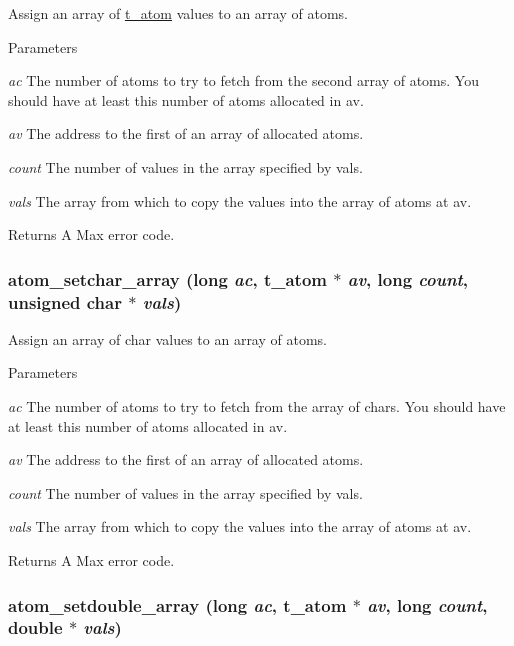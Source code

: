 Assign an array of \hyperlink{structt__atom}{t\_\-atom} values to an array of atoms. 
\begin{DoxyParams}{Parameters}
\item[{\em ac}]The number of atoms to try to fetch from the second array of atoms. You should have at least this number of atoms allocated in av. \item[{\em av}]The address to the first of an array of allocated atoms. \item[{\em count}]The number of values in the array specified by vals. \item[{\em vals}]The array from which to copy the values into the array of atoms at av. \end{DoxyParams}
\begin{DoxyReturn}{Returns}
A Max error code. 
\end{DoxyReturn}
\hypertarget{group__atom_ga88e54464a226b4fa99113f39ca522fb2}{
\subsubsection[{atom\_\-setchar\_\-array}]{ atom\_\-setchar\_\-array (long {\em ac}, \/  {\bf t\_\-atom} $\ast$ {\em av}, \/  long {\em count}, \/  unsigned char $\ast$ {\em vals})}}
\label{group__atom_ga88e54464a226b4fa99113f39ca522fb2}


Assign an array of char values to an array of atoms. 
\begin{DoxyParams}{Parameters}
\item[{\em ac}]The number of atoms to try to fetch from the array of chars. You should have at least this number of atoms allocated in av. \item[{\em av}]The address to the first of an array of allocated atoms. \item[{\em count}]The number of values in the array specified by vals. \item[{\em vals}]The array from which to copy the values into the array of atoms at av. \end{DoxyParams}
\begin{DoxyReturn}{Returns}
A Max error code. 
\end{DoxyReturn}
\hypertarget{group__atom_ga4a5f89178488b1e8bfe75a1f270058d5}{
\subsubsection[{atom\_\-setdouble\_\-array}]{ atom\_\-setdouble\_\-array (long {\em ac}, \/  {\bf t\_\-atom} $\ast$ {\em av}, \/  long {\em count}, \/  double $\ast$ {\em vals})}}
\label{group__atom_ga4a5f89178488b1e8bfe75a1f270058d5}


